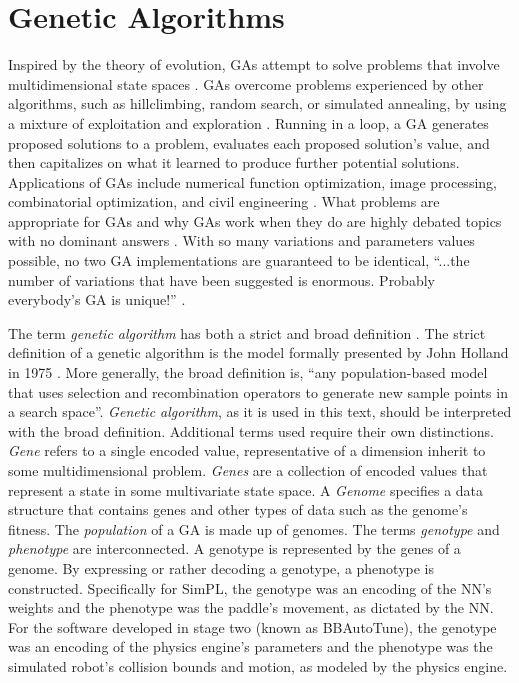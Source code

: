 \section{Genetic Algorithms}

Inspired by the theory of evolution, GAs attempt to solve problems that involve multidimensional state spaces \cite{ColinReeves}\cite{Beasley93anoverview}. GAs overcome problems experienced by other algorithms, such as hillclimbing, random search, or simulated annealing, by using a mixture of exploitation and exploration \cite{Beasley93anoverview}. Running in a loop, a GA generates proposed solutions to a problem, evaluates each proposed solution's value, and then capitalizes on what it learned to produce further potential solutions. Applications of GAs include numerical function optimization, image processing, combinatorial optimization, and civil engineering \cite{Beasley93anoverview}. What problems are appropriate for GAs and why GAs work when they do are highly debated topics with no dominant answers \cite{ColinReeves}. With so many variations and parameters values possible, no two GA implementations are guaranteed to be identical, ``...the number of variations that have been suggested is enormous. Probably everybody's GA is unique!'' \cite{ColinReeves}.

The term \textit{genetic algorithm} has both a strict and broad definition \cite{Whitley94agenetic}. The strict definition of a genetic algorithm is the model formally presented by John Holland in 1975 \cite{ColinReeves}. More generally, the broad definition is, ``any population-based model that uses selection and recombination operators to generate new sample points in a search space''\cite{Whitley94agenetic}. \textit{Genetic algorithm}, as it is used in this text, should be interpreted with the broad definition. Additional terms used require their own distinctions. \textit{Gene} refers to a single encoded value, representative of a dimension inherit to some multidimensional problem. \textit{Genes} are a collection of encoded values that represent a state in some multivariate state space. A \textit{Genome} specifies a data structure that contains genes and other types of data such as the genome's fitness. The \textit{population} of a GA is made up of genomes. The terms \textit{genotype} and \textit{phenotype} are interconnected. A genotype is represented by the genes of a genome. By expressing or rather decoding a genotype, a phenotype is constructed. Specifically for SimPL, the genotype was an encoding of the NN's weights and the phenotype was the paddle's movement, as dictated by the NN. For the software developed in stage two (known as BBAutoTune), the genotype was an encoding of the physics engine's parameters and the phenotype was the simulated robot's collision bounds and motion, as modeled by the physics engine.           

